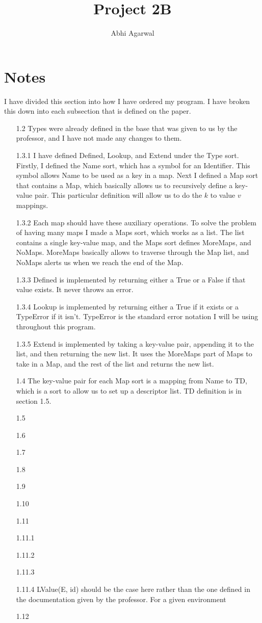 \documentclass[11pt, oneside]{article}
\title{Project 2B}
\author{Abhi Agarwal}
\date{}
\begin{document}
\maketitle
\section*{Notes}
\par I have divided this section into how I have ordered my program. I have broken this down into each subsection that is defined on the paper.
\begin{enumerate}
\item[1.2] Types were already defined in the base that was given to us by the professor, and I have not made any changes to them.
\item[1.3.1] I have defined Defined, Lookup, and Extend under the Type sort. Firstly, I defined the Name sort, which has a symbol for an Identifier. This symbol allows Name to be used as a key in a map. Next I defined a Map sort that contains a Map, which basically allows us to recursively define a key-value pair. This particular definition will allow us to do the $k$ to value $v$ mappings.
\item[1.3.2] Each map should have these auxiliary operations. To solve the problem of having many maps I made a Maps sort, which works as a list. The list contains a single key-value map, and the Maps sort defines MoreMaps, and NoMaps. MoreMaps basically allows to traverse through the Map list, and NoMaps alerts us when we reach the end of the Map.
\item[1.3.3] Defined is implemented by returning either a True or a False if that value exists. It never throws an error.
\item[1.3.4] Lookup is implemented by returning either a True if it exists or a TypeError if it isn't. TypeError is the standard error notation I will be using throughout this program.
\item[1.3.5] Extend is implemented by taking a key-value pair, appending it to the list, and then returning the new list. It uses the MoreMaps part of Maps to take in a Map, and the rest of the list and returns the new list.
\item[1.4] The key-value pair for each Map sort is a mapping from Name to TD, which is a sort to allow us to set up a descriptor list. TD definition is in section 1.5.
\item[1.5] 
\item[1.6]
\item[1.7] 
\item[1.8] 
\item[1.9] 
\item[1.10]
\item[1.11]
\item[1.11.1]
\item[1.11.2]
\item[1.11.3]
\item[1.11.4] LValue(E, id) should be the case here rather than the one defined in the documentation given by the professor. For a given environment 
\item[1.12] 


\end{enumerate}
\end{document}
